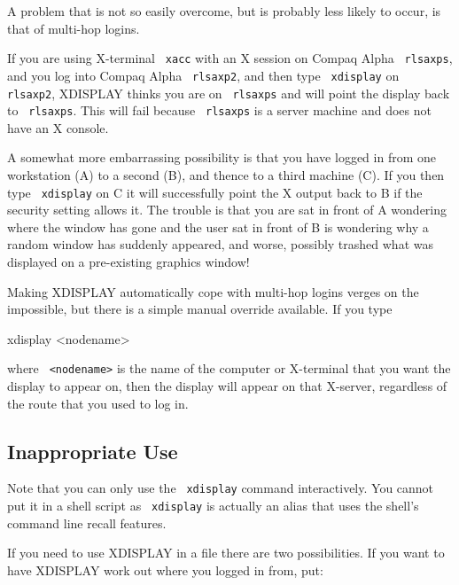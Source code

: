 \documentclass[twoside,11pt,nolof,noabs]{starlink}
\begin{document}
A problem that is not so easily overcome, but is probably less likely
to occur, is that of multi-hop logins.

If you are using X-terminal \texttt{ xacc} with an X session on Compaq Alpha
\texttt{ rlsaxps},  and you log into Compaq Alpha \texttt{ rlsaxp2}, and then type
\texttt{ xdisplay} on \texttt{ rlsaxp2}, XDISPLAY thinks you are on \texttt{ rlsaxps}
and will point the display back to \texttt{ rlsaxps}.  This will fail because
\texttt{ rlsaxps} is a server machine and does not have an X console.

A somewhat more embarrassing possibility is that you have logged in from
 one workstation (A) to a second (B), and thence to a third machine
(C). If you then type \texttt{ xdisplay} on C it will successfully point
the X output back to B if the security setting allows it. The trouble
is that you are sat in front of A wondering where the window has gone
and the user sat in front of B is wondering why a random window has
suddenly appeared, and worse, possibly trashed what was displayed on
a pre-existing graphics window!

Making XDISPLAY automatically cope with multi-hop logins verges on the
impossible, but there is a simple manual override available. If you
type

\begin{terminalv}
xdisplay <nodename>
\end{terminalv}

where \texttt{ <nodename>} is the name of the computer or X-terminal that
you want the display to appear on, then the display will appear on that
X-server, regardless of the route that you used to log in.

\subsection{\label{inappropriate}Inappropriate Use}

Note that you can only use the \texttt{ xdisplay} command interactively.  You
cannot put it in a shell script as \texttt{ xdisplay} is actually an alias
that uses the shell's command line recall features.

If you need to use XDISPLAY in a file there are two possibilities.  If
you want to have XDISPLAY work out where you logged in from, put:

\begin{terminalv}
\end{terminalv}
\end{document}
